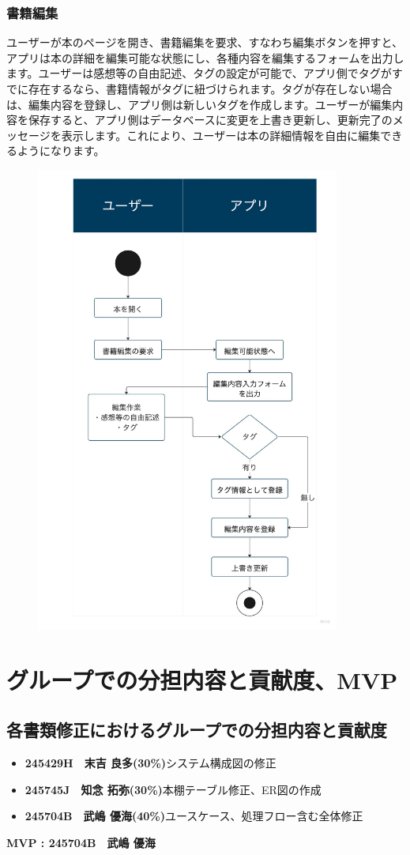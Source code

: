 \documentclass[a4paper, 11pt, titlepage]{jsarticle}
\begin{document}
\subsubsection{書籍編集}
ユーザーが本のページを開き、書籍編集を要求、すなわち編集ボタンを押すと、アプリは本の詳細を編集可能な状態にし、各種内容を編集するフォームを出力します。ユーザーは感想等の自由記述、タグの設定が可能で、アプリ側でタグがすでに存在するなら、書籍情報がタグに紐づけられます。タグが存在しない場合は、編集内容を登録し、アプリ側は新しいタグを作成します。ユーザーが編集内容を保存すると、アプリ側はデータベースに変更を上書き更新し、更新完了のメッセージを表示します。これにより、ユーザーは本の詳細情報を自由に編集できるようになります。
\begin{figure}[h]
\centering
\includegraphics[width=100mm]{flow-henshu.jpg}
\label{fig:func}
\end{figure}

\section{グループでの分担内容と貢献度、MVP}%

\subsection{各書類修正におけるグループでの分担内容と貢献度}
\begin{itemize}
    \item \textbf{245429H　末吉 良多(30\%)}システム構成図の修正
    \item \textbf{245745J　知念 拓弥(30\%)}本棚テーブル修正、ER図の作成
    \item \textbf{245704B　武嶋 優海(40\%)}ユースケース、処理フロー含む全体修正
\end{itemize}

\textbf{MVP : 245704B　武嶋 優海}
\end{document}
